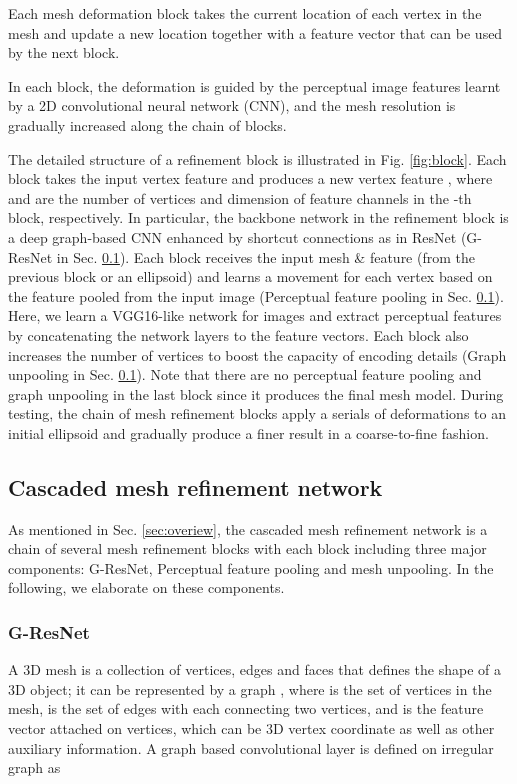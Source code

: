\documentclass[runningheads]{llncs}
\newcommand{\figref}[1]{Fig. \ref{#1}}
\newcommand{\secref}[1]{Sec. \ref{#1}}
\begin{document}
Each mesh deformation block takes the current location of each vertex in the mesh and update a new location together with a feature vector that can be used by the next block.



In each block, the deformation is guided by the perceptual image features learnt by a 2D convolutional neural network (CNN), and the mesh resolution is gradually increased along the chain of blocks.

The detailed structure of a refinement block is illustrated in \figref{fig:block}. Each block takes the input vertex feature  and produces a new vertex feature , where  and  are the number of vertices and dimension of feature channels in the -th block, respectively. In particular, the backbone network in the refinement block is a deep graph-based CNN \cite{} enhanced by shortcut connections as in ResNet \cite{} (G-ResNet in \secref{sec:cmrn}).
Each block receives the input mesh \& feature (from the previous block or an ellipsoid) and learns a movement for each vertex based on the feature pooled from the input image (Perceptual feature pooling in \secref{sec:cmrn}). Here, we learn a VGG16-like network for images and extract perceptual features \cite{} by concatenating the network layers to the feature vectors.
Each block also increases the number of vertices to boost the capacity of encoding details (Graph unpooling in \secref{sec:cmrn}).  
Note that there are no perceptual feature pooling and graph unpooling in the last block since it produces the final mesh model. 
During testing, the chain of mesh refinement blocks apply a serials of deformations to an initial ellipsoid and gradually produce a finer result in a coarse-to-fine fashion.






\subsection{Cascaded mesh refinement network}
\label{sec:cmrn}
As mentioned in \secref{sec:overiew}, the cascaded mesh refinement network is a chain of several mesh refinement blocks with each block including three major components: G-ResNet, Perceptual feature pooling and mesh unpooling. In the following, we elaborate on these components.



\subsubsection{G-ResNet}
A 3D mesh is a collection of vertices, edges and faces that defines the shape of a 3D object; it can be represented by a graph , where  is the set of  vertices in the mesh,  is the set of  edges with each connecting two vertices, and  is the feature vector attached on vertices, which can be 3D vertex coordinate as well as other auxiliary information.
A graph based convolutional layer is defined on irregular graph as
\end{document}
